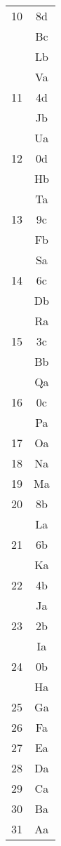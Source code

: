 \documentclass[11pt,a4paper]{scrarticle}
\theoremstyle{definition}
\begin{document}
\begin{longtable}{|c|c|}
    \hline
    10         & 8d              \\ &Bc\\ &Lb\\ &Va\\
    \hline
    11         & 4d              \\ &Jb\\ &Ua\\
    \hline
    12         & 0d              \\ &Hb\\ &Ta\\
    \hline
    13         & 9c              \\ &Fb\\ &Sa\\
    \hline
    14         & 6c              \\ &Db\\ &Ra\\
    \hline
    15         & 3c              \\ &Bb\\ &Qa\\
    \hline
    16         & 0c              \\ &Pa\\
    \hline
    17         & Oa              \\
    \hline
    18         & Na              \\
    \hline
    19         & Ma              \\
    \hline
    20         & 8b              \\ &La\\
    \hline
    21         & 6b              \\ &Ka\\
    \hline
    22         & 4b              \\ &Ja\\
    \hline
    23         & 2b              \\ &Ia\\
    \hline
    24         & 0b              \\ &Ha\\
    \hline
    25         & Ga              \\
    \hline
    26         & Fa              \\
    \hline
    27         & Ea              \\
    \hline
    28         & Da              \\
    \hline
    29         & Ca              \\
    \hline
    30         & Ba              \\
    \hline
    31         & Aa              \\
    \hline
\end{longtable}
\end{document}

